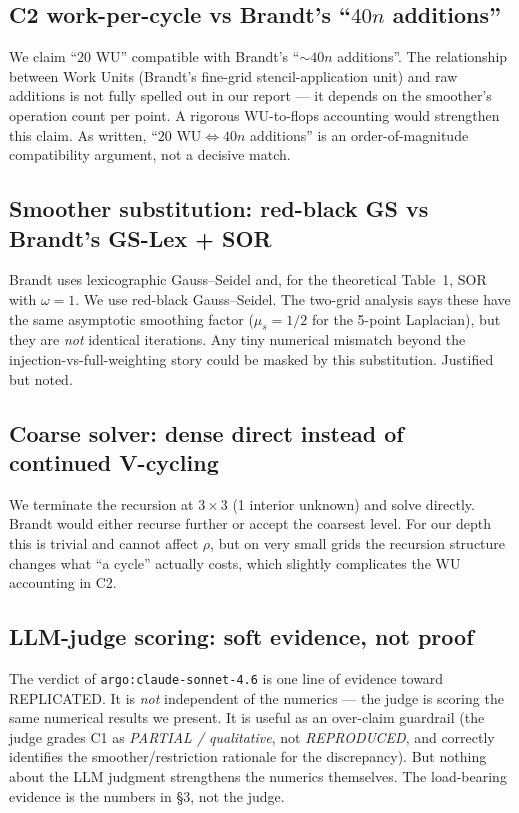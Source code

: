 \documentclass[11pt]{article}
\begin{document}
\subsection{C2 work-per-cycle vs Brandt's ``$40n$ additions''}
We claim ``20 WU'' compatible with Brandt's ``$\sim 40n$ additions''. The relationship between Work Units (Brandt's fine-grid stencil-application unit) and raw additions is not fully spelled out in our report --- it depends on the smoother's operation count per point. A rigorous WU-to-flops accounting would strengthen this claim. As written, ``$20 \text{ WU} \Leftrightarrow 40n$ additions'' is an order-of-magnitude compatibility argument, not a decisive match.

\subsection{Smoother substitution: red-black GS vs Brandt's GS-Lex + SOR}
Brandt uses lexicographic Gauss--Seidel and, for the theoretical Table~1, SOR with $\omega=1$. We use red-black Gauss--Seidel. The two-grid analysis says these have the same asymptotic smoothing factor ($\mu_s = 1/2$ for the 5-point Laplacian), but they are \emph{not} identical iterations. Any tiny numerical mismatch beyond the injection-vs-full-weighting story could be masked by this substitution. Justified but noted.

\subsection{Coarse solver: dense direct instead of continued V-cycling}
We terminate the recursion at $3 \times 3$ (1 interior unknown) and solve directly. Brandt would either recurse further or accept the coarsest level. For our depth this is trivial and cannot affect $\rho$, but on very small grids the recursion structure changes what ``a cycle'' actually costs, which slightly complicates the WU accounting in C2.

\subsection{LLM-judge scoring: soft evidence, not proof}
The verdict of \texttt{argo:claude-sonnet-4.6} is one line of evidence toward REPLICATED. It is \emph{not} independent of the numerics --- the judge is scoring the same numerical results we present. It is useful as an over-claim guardrail (the judge grades C1 as \emph{PARTIAL / qualitative}, not \emph{REPRODUCED}, and correctly identifies the smoother/restriction rationale for the discrepancy). But nothing about the LLM judgment strengthens the numerics themselves. The load-bearing evidence is the numbers in \S3, not the judge.
\end{document}
